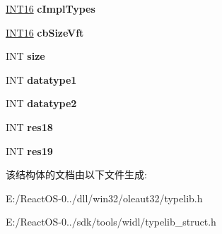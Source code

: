 \begin{DoxyCompactItemize}
\item 
\mbox{\label{structtag_m_s_f_t___type_info_base_ab2de022540b948d543240bd675353ff1}} 
\hyperlink{_processor_bind_8h_a30f500129d8c688af07726d5d34ce52d}{I\+N\+T16} {\bfseries c\+Impl\+Types}
\item 
\mbox{\label{structtag_m_s_f_t___type_info_base_a935f1605ceaf533ed5deb2d84ce6be7b}} 
\hyperlink{_processor_bind_8h_a30f500129d8c688af07726d5d34ce52d}{I\+N\+T16} {\bfseries cb\+Size\+Vft}
\item 
\mbox{\label{structtag_m_s_f_t___type_info_base_a7838003e6ae548c6208cbb385df4df44}} 
I\+NT {\bfseries size}
\item 
\mbox{\label{structtag_m_s_f_t___type_info_base_ae8c81b6881b040c94c43f0a5dd3b22e5}} 
I\+NT {\bfseries datatype1}
\item 
\mbox{\label{structtag_m_s_f_t___type_info_base_afbdf8b4eda82c3118d3b011207b1d0f7}} 
I\+NT {\bfseries datatype2}
\item 
\mbox{\label{structtag_m_s_f_t___type_info_base_ab000780f2e645ca5ab8817fd08da4dca}} 
I\+NT {\bfseries res18}
\item 
\mbox{\label{structtag_m_s_f_t___type_info_base_a03d1b6a448a3a78705665d5c82049b7e}} 
I\+NT {\bfseries res19}
\end{DoxyCompactItemize}


该结构体的文档由以下文件生成\+:\begin{DoxyCompactItemize}
\item 
E\+:/\+React\+O\+S-\/0../dll/win32/oleaut32/typelib.\+h\item 
E\+:/\+React\+O\+S-\/0../sdk/tools/widl/typelib\+\_\+struct.\+h\end{DoxyCompactItemize}
